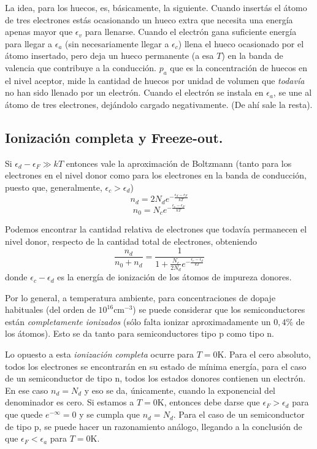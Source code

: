 \documentclass[12pt,a4paper]{article}
\begin{document}
La idea, para los huecos, es, básicamente, la siguiente. Cuando insertás el átomo de tres electrones estás ocasionando un hueco extra que necesita una energía apenas mayor que $\epsilon _{v}$ para llenarse. Cuando el electrón gana suficiente energía para llegar a $\epsilon _{a}$ (sin necesariamente llegar a $\epsilon _{c}$) llena el hueco ocasionado por el átomo insertado, pero deja un hueco permanente (a esa $T$) en la banda de valencia que contribuye a la conducción. $p_{a}$ que es la concentración de huecos en el nivel aceptor, mide la cantidad de huecos por unidad de volumen que \emph{todavía} no han sido llenado por un electrón. Cuando el electrón se instala en $\epsilon _{a}$, se une al átomo de tres electrones, dejándolo cargado negativamente. (De ahí sale la resta).

\subsection{Ionización completa y Freeze-out.}

Si $\epsilon _{d} - \epsilon _{F} \gg kT$ entonces vale la aproximación de Boltzmann (tanto para los electrones en el nivel donor como para los electrones en la banda de conducción, puesto que, generalmente, $\epsilon _{c} > \epsilon _{d}$)
\[ n_{d} = 2N_{d} e^{-\frac{\epsilon _{d} - \epsilon _{F}}{kT}} \]
\[ n_{0} = N_{c} e^{- \frac{\epsilon _{c} - \epsilon _{F}}{kT}} \]

Podemos encontrar la cantidad relativa de electrones que todavía permanecen el nivel donor, respecto de la cantidad total de electrones, obteniendo
\[ \frac{n_{d}}{n_{0}+n_{d}} = \frac{1}{1+\frac{N_{c}}{2N_{d}}e^{-\frac{\epsilon _{c} - \epsilon _{d}}{kT}}} \]
donde $\epsilon _{c} - \epsilon _{d}$ es la energía de ionización de los átomos de impureza donores.

Por lo general, a temperatura ambiente, para concentraciones de dopaje habituales (del orden de $10^{16}\textrm{cm}^{-3}$) se puede considerar que los semiconductores están \emph{completamente ionizados} (sólo falta ionizar aproximadamente un $0,4\%$ de los átomos). Esto se da tanto para semiconductores tipo p como tipo n.

Lo opuesto a esta \emph{ionización completa} ocurre para $T=0$K. Para el cero absoluto, todos los electrones se encontrarán en su estado de mínima energía, para el caso de un semiconductor de tipo n, todos los estados donores contienen un electrón. En ese caso $n_{d}=N_{d}$ y eso se da, únicamente, cuando la exponencial del denominador es cero. Si estamos a $T=0$K, entonces debe darse que $\epsilon _{F} > \epsilon _{d}$ para que quede $e^{-\infty}=0$ y se cumpla que $n_{d}=N_{d}$. Para el caso de un semiconductor de tipo p, se puede hacer un razonamiento análogo, llegando a la conclusión de que $\epsilon _{F} < \epsilon _{a}$ para $T=0$K.
\end{document}
